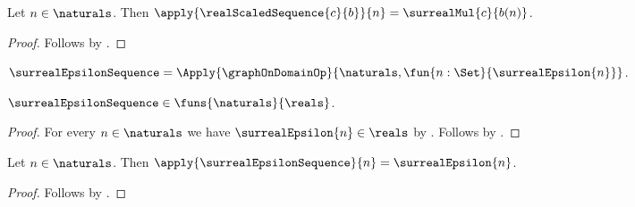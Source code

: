 \begin{proposition}\label{real_scaled_sequence_apply}
    Let $n\in\naturals$.
    Then $\apply{\realScaledSequence{c}{b}}{n}=\surrealMul{c}{b(n)}$.
\end{proposition}
\begin{proof}
    Follows by
        .
\end{proof}

\begin{definition}\label{surreal_epsilon_sequence}
    $\surrealEpsilonSequence=\Apply{\graphOnDomainOp}
        {\naturals,\fun{n:\Set}{\surrealEpsilon{n}}}$.
\end{definition}

\begin{proposition}\label{surreal_epsilon_sequence_typed}
    $\surrealEpsilonSequence\in\funs{\naturals}{\reals}$.
\end{proposition}
\begin{proof}
    For every $n\in\naturals$ we have $\surrealEpsilon{n}\in\reals$
        by .
    Follows by
        .
\end{proof}

\begin{proposition}\label{surreal_epsilon_sequence_apply}
    Let $n\in\naturals$.
    Then $\apply{\surrealEpsilonSequence}{n}=\surrealEpsilon{n}$.
\end{proposition}
\begin{proof}
    Follows by
        .
\end{proof}

